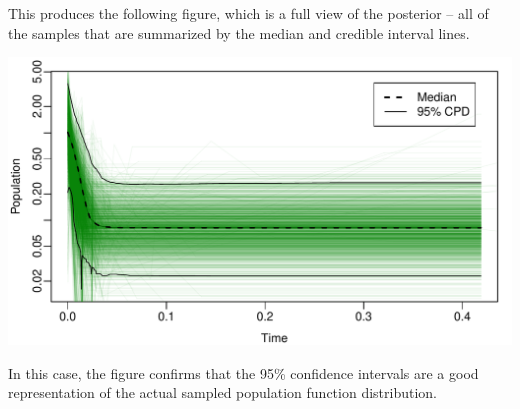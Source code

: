 \documentclass[a4paper,11pt]{article}
\begin{document}
This produces the following figure, which is a full view of the posterior --
all of the samples that are summarized by the median and credible interval
lines.

\includegraphics[width=\textwidth]{figures/mystery3.pdf}

In this case, the figure confirms that the 95\% confidence intervals are a good
representation of the actual sampled population function distribution.



\end{document}

